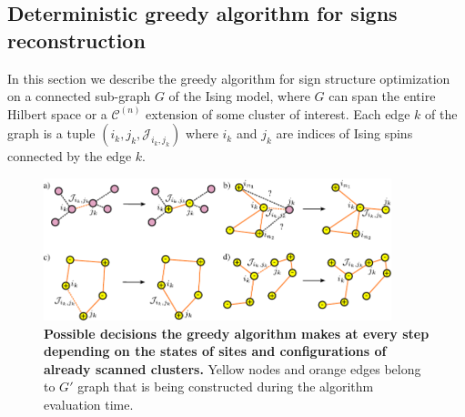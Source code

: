 
\subsection{Deterministic greedy algorithm for signs reconstruction}

In this section we describe the greedy algorithm for sign structure optimization on a connected sub-graph $G$ of the Ising model, where $G$ can span the entire Hilbert space or a $\mathcal{C}^{(n)}$ extension of some cluster of interest. Each edge $k$ of the graph is a tuple $(i_k, j_k, \mathcal{J}_{i_k, j_k})$ where $i_k$ and $j_k$ are indices of Ising spins connected by the edge $k$.

\begin{figure}
    \centering
    \includegraphics[width=0.9\textwidth]{handmade/greedy_steps_new.pdf}%
    \caption{\textbf{Possible decisions the greedy algorithm makes at every step depending on the states of sites and configurations of already scanned clusters.} Yellow nodes and orange edges belong to $G'$ graph that is being constructed during the algorithm evaluation time.}
    \label{fig:greedy_steps}
\end{figure}
    
